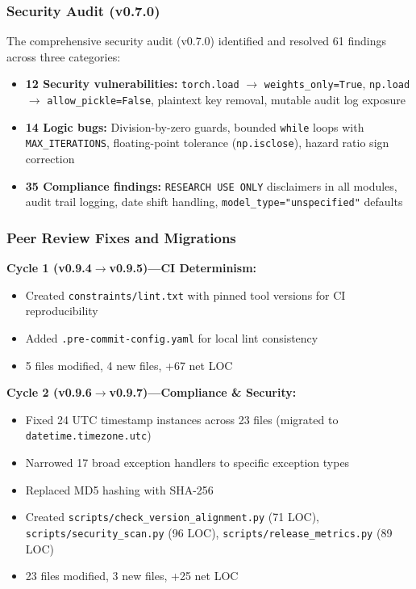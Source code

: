 \subsubsection{Security Audit (v0.7.0)}

The comprehensive security audit (v0.7.0) identified and resolved 61 findings across three categories:
\begin{itemize}
  \item \textbf{12 Security vulnerabilities:} \texttt{torch.load} $\to$ \texttt{weights\_only=True}, \texttt{np.load} $\to$ \texttt{allow\_pickle=False}, plaintext key removal, mutable audit log exposure
  \item \textbf{14 Logic bugs:} Division-by-zero guards, bounded \texttt{while} loops with \texttt{MAX\_ITERATIONS}, floating-point tolerance (\texttt{np.isclose}), hazard ratio sign correction
  \item \textbf{35 Compliance findings:} \texttt{RESEARCH USE ONLY} disclaimers in all modules, audit trail logging, date shift handling, \texttt{model\_type="unspecified"} defaults
\end{itemize}

\subsubsection{Peer Review Fixes and Migrations}

\textbf{Cycle 1 (v0.9.4$\to$v0.9.5)---CI Determinism:}
\begin{itemize}
  \item Created \texttt{constraints/lint.txt} with pinned tool versions for CI reproducibility
  \item Added \texttt{.pre-commit-config.yaml} for local lint consistency
  \item 5 files modified, 4 new files, +67 net LOC
\end{itemize}

\textbf{Cycle 2 (v0.9.6$\to$v0.9.7)---Compliance \& Security:}
\begin{itemize}
  \item Fixed 24 UTC timestamp instances across 23 files (migrated to \texttt{datetime.timezone.utc})
  \item Narrowed 17 broad exception handlers to specific exception types
  \item Replaced MD5 hashing with SHA-256
  \item Created \texttt{scripts/check\_version\_alignment.py} (71 LOC), \texttt{scripts/security\_scan.py} (96 LOC), \texttt{scripts/release\_metrics.py} (89 LOC)
  \item 23 files modified, 3 new files, +25 net LOC
\end{itemize}

